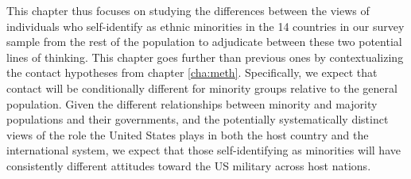 This chapter thus focuses on studying the differences between the views of individuals who self-identify as ethnic minorities in the 14 countries in our survey sample from the rest of the population to adjudicate between these two potential lines of thinking. This chapter goes further than previous ones by contextualizing the contact hypotheses from chapter \ref{cha:meth}. Specifically, we expect that contact will be conditionally different for minority groups relative to the general population. Given the different relationships between minority and majority populations and their governments, and the potentially systematically distinct views of the role the United States plays in both the host country and the international system, we expect that those self-identifying as minorities will have consistently different attitudes toward the US military across host nations. 






